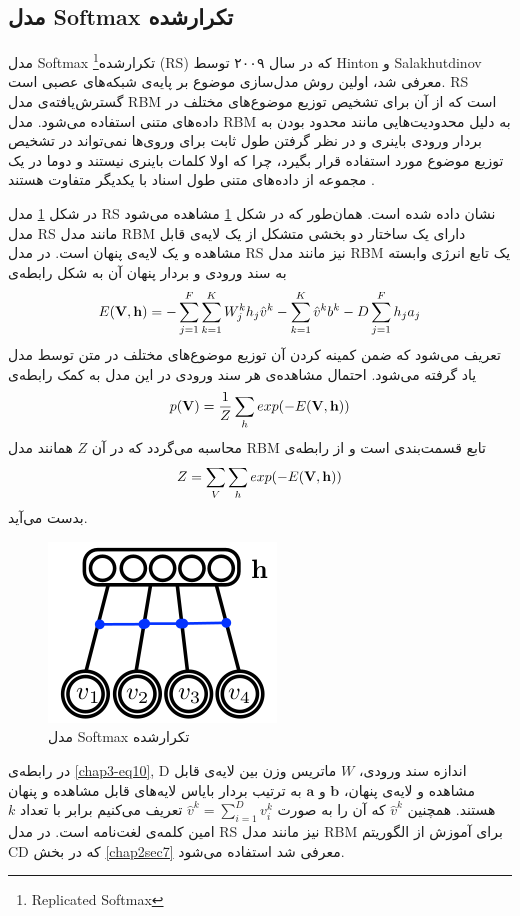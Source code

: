 	\subsection{مدل Softmax تکرارشده}
	\label{chap3sec3sub5}
	
	مدل
	Softmax
	تکرارشده\footnote{Replicated Softmax}
	(RS)
	که در سال ۲۰۰۹ توسط
	Hinton
	و
	Salakhutdinov \cite{hinton2009replicated}
	معرفی‌ شد، اولین روش مدل‌سازی موضوع بر پایه‌ی شبکه‌های عصبی است.
	RS
	گسترش‌یافته‌ی مدل
	RBM
	است که از آن برای تشخیص توزیع موضوع‌های مختلف در داده‌های متنی استفاده می‌‌شود. مدل
	RBM
	به دلیل محدودیت‌هایی مانند محدود بودن به بردار ورودی باینری و در نظر گرفتن طول ثابت برای وروی‌ها نمی‌‌تواند در تشخیص توزیع موضوع مورد استفاده قرار بگیرد، چرا که اولا کلمات باینری نیستند و دوما در یک مجموعه از داده‌های متنی طول اسناد با یکدیگر متفاوت هستند
	\cite{hinton2009replicated}.
	
	در شکل
	\ref{chap3-fig6}
	مدل
	RS
	نشان داده شده است. همان‌طور که در شکل
	\ref{chap3-fig6}
	مشاهده می‌‌شود مدل
	RS
	مانند مدل
RBM
	دارای یک ساختار دو بخشی متشکل از یک لایه‌ی قابل مشاهده و یک لایه‌ی پنهان است. در مدل
	RS
	نیز مانند مدل
	RBM
	یک تابع انرژی وابسته به سند ورودی و بردار پنهان آن به شکل رابطه‌ی
	\begin{align}
		\centering
		\label{chap3-eq10}
		E(\textbf{V},\textbf{h}) = -\sum_{j=1}^{F} \sum_{k=1}^{K} W_j^k h_j \hat{v}^k - \sum_{k=1}^K \hat{v}^k b^k -D\sum_{j=1}^F h_ja_j
	\end{align}
	تعریف می‌‌شود که ضمن کمینه کردن آن توزیع موضوع‌های مختلف در متن توسط مدل یاد گرفته می‌‌شود. احتمال مشاهده‌ی هر سند ورودی در این مدل به کمک رابطه‌ی
	\begin{align}
		\centering
		\label{chap3-eq11}
		p(\textbf{V}) = \dfrac{1}{Z}\sum_{h}exp(-E(\textbf{V},\textbf{h}))
	\end{align}
	محاسبه می‌‌گردد که در آن
	$Z$
	همانند مدل
	RBM
	تابع قسمت‌بندی است و از رابطه‌ی
	\begin{align}
		\centering
		\label{chap3-eq12}
		Z = \sum_{V}\sum_{h}exp(-E(\textbf{V},\textbf{h}))
	\end{align}
	بدست می‌‌آید.
	\begin{figure}[!t]
		\centering
		\includegraphics[scale=0.4]{chap3-img/RS}
		\caption{مدل Softmax تکرارشده \cite{hinton2009replicated}}
		\label{chap3-fig6}
	\end{figure}	
	در رابطه‌ی
	\ref{chap3-eq10}, D
	اندازه سند ورودی،
	$W$
	ماتریس وزن بین لایه‌ی قابل مشاهده و لایه‌ی پنهان،
	$\textbf{b}$
	و
	$\textbf{a}$
	به ترتیب بردار بایاس لایه‌های قابل مشاهده و پنهان هستند. همچنین
	$\hat{v}^k$
	که آن را به صورت
	$\hat{v}^k = \sum_{i=1}^{D} v_i^k$
	 تعریف می‌‌کنیم برابر با تعداد
	$k$امین 
	کلمه‌ی لغت‌نامه است. در مدل
		RS
	نیز مانند مدل
	RBM
	برای آموزش از الگوریتم
	CD
	که در بخش
	\ref{chap2sec7}
	معرفی شد استفاده می‌‌شود.
		 
